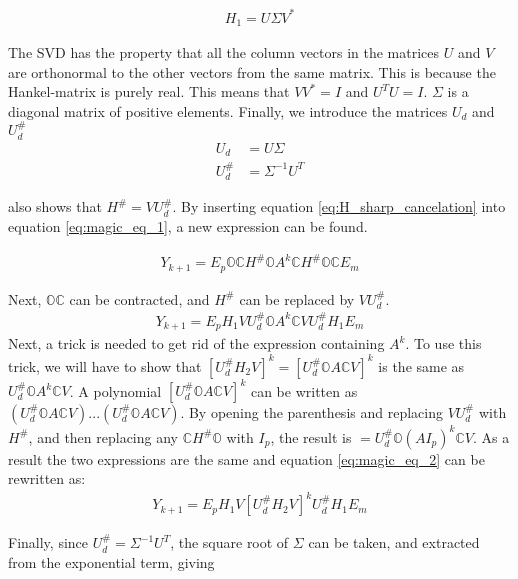 \begin{align}
    H_1 = U \Sigma V^*  
\end{align}

\noindent
The SVD has the property that all the column vectors in the matrices $U$ and $V$ are orthonormal to the other vectors from the same matrix. This is because the Hankel-matrix is purely real. This means that $VV^*=I$ and $U^TU=I$. $\Sigma$ is a diagonal matrix of positive elements.
Finally, we introduce the matrices $U_d$ and $U_d^\#$
\begin{align}
    U_d &= U \Sigma \\
    U_d ^\# &= \Sigma^{-1}U^T
\end{align}

\cite{ERA_source} also shows that $H^\# = VU^\#_d $. By inserting equation \ref{eq:H_sharp_cancelation} into equation \ref{eq:magic_eq_1}, a new expression can be found. 

\begin{align}
    \label{eq:magic_eq_2}
    Y_{k+1} = E_p \mathbb{O} \mathbb{C}H^\#  \mathbb{O} A^k \mathbb{C}H^\#  \mathbb{O}\mathbb{C}  E_m
\end{align}

Next, $\mathbb{O}\mathbb{C}$ can be contracted, and $H^\# $ can be replaced by $VU_d^\#$. 
\begin{align}
    Y_{k+1} = E_p H_1 V U_d^\#  \mathbb{O} A^k \mathbb{C} V U_d^\# H_1  E_m
\end{align}
Next, a trick is needed to get rid of the expression containing $A^k$. To use this trick, we will have to show that $\left[ U_d^\# H_2 V\right]^k  = \left[ U_d^\# \mathbb{O} A \mathbb{C} V \right]^k $ is the same as $U_d^\#  \mathbb{O} A^k \mathbb{C} V$. A polynomial $\left[ U_d^\# \mathbb{O} A \mathbb{C} V\right]^k$ can be written as $(U_d^\# \mathbb{O} A \mathbb{C} V)...(U_d^\# \mathbb{O} A \mathbb{C} V)$. By opening the parenthesis and replacing $VU_d^\#$ with $H^\#$, and then replacing any $\mathbb{C}H^\#\mathbb{O}$ with $I_p$, the result is $ = U_d^\# \mathbb{O}( A I_p)^k \mathbb{C} V$. As a result the two expressions are the same and equation \ref{eq:magic_eq_2} can be rewritten as: 
\begin{align}
    Y_{k+1} = E_pH_1 V \left[ U_d^\# H_2 V\right]^k  U_d^\# H_1  E_m
\end{align}

Finally, since $U_d^\# = \Sigma^{-1} U^T$, the square root of $\Sigma$ can be taken, and extracted from the exponential term, giving 

